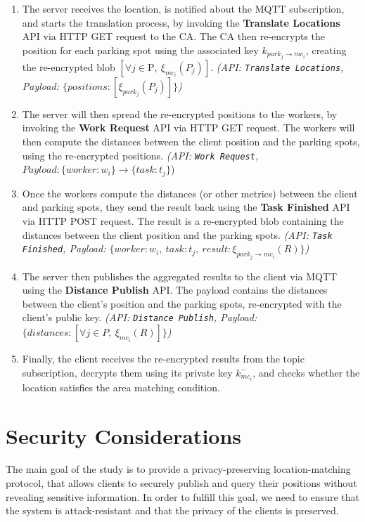 \begin{enumerate}
    \item The server receives the location, is notified about the MQTT subscription, and starts the translation process, by invoking the \textbf{Translate Locations} API via HTTP GET request to the CA. The CA then re-encrypts the position for each parking spot using the associated key $k_{park_j \to mc_i}$, creating the re-encrypted blob $[\forall j \in \text{P},\ \xi_{mc_i}(P_j)]$. \emph{(API: \texttt{Translate Locations}, Payload: $\{positions: [\xi_{park_j}(P_j)]\}$)}
    \item The server will then spread the re-encrypted positions to the workers, by invoking the \textbf{Work Request} API via HTTP GET request. The workers will then compute the distances between the client position and the parking spots, using the re-encrypted positions. \emph{(API: \texttt{Work Request}, $Payload: \{ worker: w_i \} \to \{task: t_j \} $})
    \item Once the workers compute the distances (or other metrics) between the client and parking spots, they send the result back using the \textbf{Task Finished} API via HTTP POST request. The result is a re-encrypted blob containing the distances between the client position and the parking spots. \emph{(API: \texttt{Task Finished}, Payload: $\{worker: w_i,\ task: t_j,\ result: \xi_{park_j \to mc_i}(R)\}$)}
    \item The server then publishes the aggregated results to the client via MQTT using the \textbf{Distance Publish} API. The payload contains the distances between the client's position and the parking spots, re-encrypted with the client's public key. \emph{(API: \texttt{Distance Publish}, Payload: $\{distances: [\forall j \in P,\ \xi_{mc_i}(R)]\}$)}
    \item Finally, the client receives the re-encrypted results from the topic subscription, decrypts them using its private key $k_{mc_i}^-$, and checks whether the location satisfies the area matching condition.
\end{enumerate}

\section{Security Considerations}

The main goal of the study is to provide a privacy-preserving location-matching protocol, that allows clients to securely publish and query their positions without revealing sensitive information. In order to fulfill this goal, we need to ensure that the system is attack-resistant and that the privacy of the clients is preserved.

